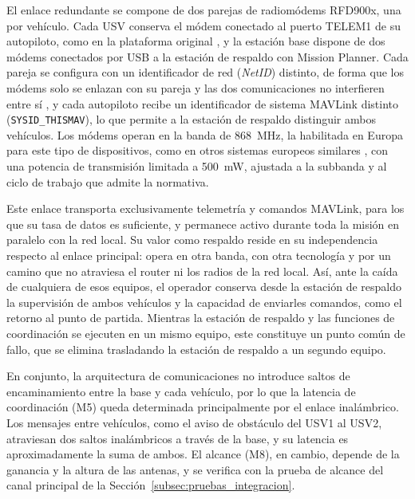 El enlace redundante se compone de dos parejas de radiomódems RFD900x, una por vehículo. Cada USV conserva el 
módem conectado al puerto TELEM1 de su autopiloto, como en la plataforma original \cite{iniesta2025}, y la 
estación base dispone de dos módems conectados por USB a la estación de respaldo con Mission Planner. Cada pareja 
se configura con un identificador de red (\textit{NetID}) distinto, de forma que los módems solo se enlazan con 
su pareja y las dos comunicaciones no interfieren entre sí \cite{Cite10}, y cada autopiloto recibe un 
identificador de sistema MAVLink distinto (\texttt{SYSID\_THISMAV}), lo que permite a la estación de respaldo 
distinguir ambos vehículos. Los módems operan en la banda de 868~MHz, la habilitada en Europa para este tipo de 
dispositivos, como en otros sistemas europeos similares \cite{gogendeau2024}, con una potencia de transmisión 
limitada a 500~mW, ajustada a la subbanda y al ciclo de trabajo que admite la normativa.
 
Este enlace transporta exclusivamente telemetría y comandos MAVLink, para los que su tasa de datos es suficiente, 
y permanece activo durante toda la misión en paralelo con la red local. Su valor como respaldo reside en su 
independencia respecto al enlace principal: opera en otra banda, con otra tecnología y por un camino que no 
atraviesa el router ni los radios de la red local. Así, ante la caída de cualquiera de esos equipos, el operador 
conserva desde la estación de respaldo la supervisión de ambos vehículos y la capacidad de enviarles comandos, 
como el retorno al punto de partida. Mientras la estación de respaldo y las funciones de coordinación se ejecuten 
en un mismo equipo, este constituye un punto común de fallo, que se elimina trasladando la estación de respaldo a 
un segundo equipo.
 
En conjunto, la arquitectura de comunicaciones no introduce saltos de encaminamiento entre la base y cada 
vehículo, por lo que la latencia de coordinación (M5) queda determinada principalmente por el enlace inalámbrico. 
Los mensajes entre vehículos, como el aviso de obstáculo del USV1 al USV2, atraviesan dos saltos inalámbricos a 
través de la base, y su latencia es aproximadamente la suma de ambos. El alcance (M8), en cambio, depende de la 
ganancia y la altura de las antenas, y se verifica con la prueba de alcance del canal principal de la 
Sección~\ref{subsec:pruebas_integracion}.

 
